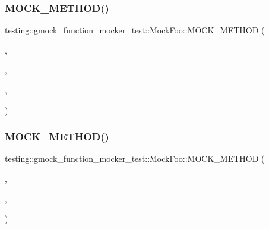 \mbox{\label{classtesting_1_1gmock__function__mocker__test_1_1_mock_foo_a0a0a46aa356c5f7314a37fc1a4d16720}} 
\subsubsection{\texorpdfstring{MOCK\_METHOD()}{MOCK\_METHOD()}\hspace{0.1cm}{\footnotesize\ttfamily [34/38]}}
{\footnotesize\ttfamily testing\+::gmock\+\_\+function\+\_\+mocker\+\_\+test\+::\+Mock\+Foo\+::\+M\+O\+C\+K\+\_\+\+M\+E\+T\+H\+OD (\begin{DoxyParamCaption}\item[{int}]{,  }\item[{\mbox{\hyperlink{classtesting_1_1gmock__function__mocker__test_1_1_foo_interface_aa14850645cd7a5462480f1717df5153c}{Type\+With\+Hole}}}]{,  }\item[{(int($\ast$)())}]{,  }\item[{()}]{ }\end{DoxyParamCaption})}

\mbox{\label{classtesting_1_1gmock__function__mocker__test_1_1_mock_foo_ab6c0fd6e1285132fb787053cd89ec5ab}} 
\subsubsection{\texorpdfstring{MOCK\_METHOD()}{MOCK\_METHOD()}\hspace{0.1cm}{\footnotesize\ttfamily [35/38]}}
{\footnotesize\ttfamily testing\+::gmock\+\_\+function\+\_\+mocker\+\_\+test\+::\+Mock\+Foo\+::\+M\+O\+C\+K\+\_\+\+M\+E\+T\+H\+OD (\begin{DoxyParamCaption}\item[{int}]{,  }\item[{\mbox{\hyperlink{classtesting_1_1gmock__function__mocker__test_1_1_foo_interface_af1f1d96db798fadbf53fbd886e7c738e}{Type\+With\+Comma}}}]{,  }\item[{((const std\+::map$<$ int, std\+::string $>$ \&))}]{ }\end{DoxyParamCaption})}

